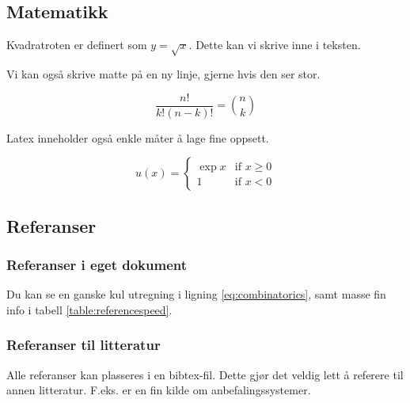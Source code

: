 \documentclass[a4paper]{article}
\begin{document}
\subsection{Matematikk}

Kvadratroten er definert som $y = \sqrt{x}$. Dette kan vi skrive inne i teksten.

Vi kan også skrive matte på en ny linje, gjerne hvis den ser stor.

\begin{equation} \label{eq:combinatorics}
    \frac{n!}{k!(n-k)!} = \binom{n}{k}    
\end{equation}

Latex inneholder også enkle måter å lage fine oppsett.

\begin{equation*}
u(x) = 
    \begin{cases} 
        \exp{x} & \text{if } x \geq 0 \\
        1       & \text{if } x < 0
    \end{cases}    
\end{equation*}

\subsection{Referanser}

\subsubsection{Referanser i eget dokument}

Du kan se en ganske kul utregning i ligning \ref{eq:combinatorics}, samt masse fin info i tabell \ref{table:referencespeed}.

\subsubsection{Referanser til litteratur}

Alle referanser kan plasseres i en bibtex-fil. Dette gjør det veldig lett å referere til annen litteratur. F.eks. er \cite{tintarev2007survey} en fin kilde om anbefalingssystemer.



\end{document}
